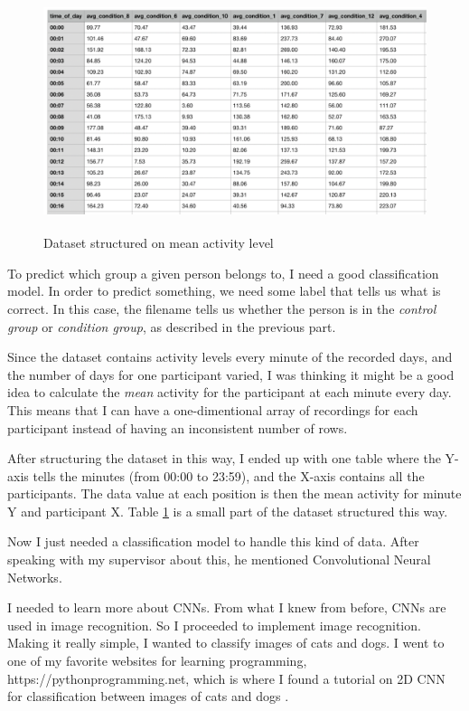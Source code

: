 \begin{figure}
  \includegraphics[height=7cm]{img/mean_by_tod.png}
  \caption{Dataset structured on mean activity level}
  \label{figure:mean_tod}
\end{figure}

To predict which group a given person belongs to, I need a good classification model. 
In order to predict something, we need some label that tells us what is correct. In this case, the filename tells us whether the person is 
in the \textit{control group} or \textit{condition group}, as described in the previous part. 

Since the dataset contains activity levels every minute of the recorded days, and the number of days for one participant varied,
I was thinking it might be a good idea to calculate the \textit{mean} activity for the participant at each minute every day.
This means that I can have a one-dimentional array of recordings for each participant instead of having an inconsistent number of rows. 

After structuring the dataset in this way, I ended up with one table where the Y-axis tells the minutes (from 00:00 to 23:59), 
and the X-axis contains all the participants. The data value at each position is then the mean activity for minute Y and participant X.
Table \ref{figure:mean_tod} is a small part of the dataset structured this way.

Now I just needed a classification model to handle this kind of data. After speaking with my supervisor about this, he mentioned 
Convolutional Neural Networks. 

I needed to learn more about CNNs. From what I knew from before, CNNs are used in image recognition. So I proceeded to implement image recognition.
Making it really simple, I wanted to classify images of cats and dogs. I went to one of my favorite websites for learning programming, https://pythonprogramming.net,
which is where I found a tutorial on 2D CNN for classification between images of cats and dogs \cite{2d_cnn}. 

